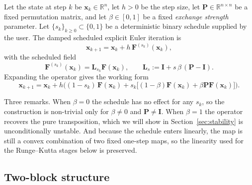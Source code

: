 \documentclass[12pt, a4paper]{article}
\theoremstyle{plain}
\theoremstyle{definition}
\theoremstyle{remark}
\newcommand{\R}{\mathbb{R}}
\newcommand{\bx}{\mathbf{x}}
\newcommand{\bF}{\mathbf{F}}
\newcommand{\bI}{\mathbf{I}}
\newcommand{\bP}{\mathbf{P}}
\newcommand{\bL}{\mathbf{L}}
\begin{document}
Let the state at step $k$ be $\bx_k \in \R^n$, let $h>0$ be the step size, let
$\bP \in \R^{n\times n}$ be a fixed permutation matrix, and let
$\beta \in [0, 1]$ be a fixed \emph{exchange strength} parameter. Let
$\{s_k\}_{k\ge0} \subset \{0,1\}$ be a deterministic binary schedule supplied
by the user. The damped scheduled explicit Euler iteration is
\begin{equation}
\bx_{k+1} = \bx_k + h\,\bF^{(s_k)}(\bx_k),
\label{eq:euler}
\end{equation}
with the scheduled field
\begin{equation}
\bF^{(s_k)}(\bx_k) = \bL_{s_k}\bF(\bx_k),
\qquad
\bL_s := \bI + s\,\beta\,(\bP - \bI).
\label{eq:field}
\end{equation}
Expanding the operator gives the working form
\begin{equation}
\boxed{\;\bx_{k+1} = \bx_k + h\Big((1-s_k)\,\bF(\bx_k)
+ s_k\big[(1-\beta)\bF(\bx_k) + \beta\bP\bF(\bx_k)\big]\Big).\;}
\label{eq:boxed}
\end{equation}

Three remarks. When $\beta = 0$ the schedule has no effect for any $s_k$, so
the construction is non-trivial only for $\beta \neq 0$ and $\bP \neq \bI$.
When $\beta = 1$ the operator recovers the pure transposition, which we will
show in Section~\ref{sec:stability} is unconditionally unstable. And because
the schedule enters linearly, the map is still a convex combination of two
fixed one-step maps, so the linearity used for the Runge--Kutta stages below
is preserved.

\subsection{Two-block structure}
\end{document}
